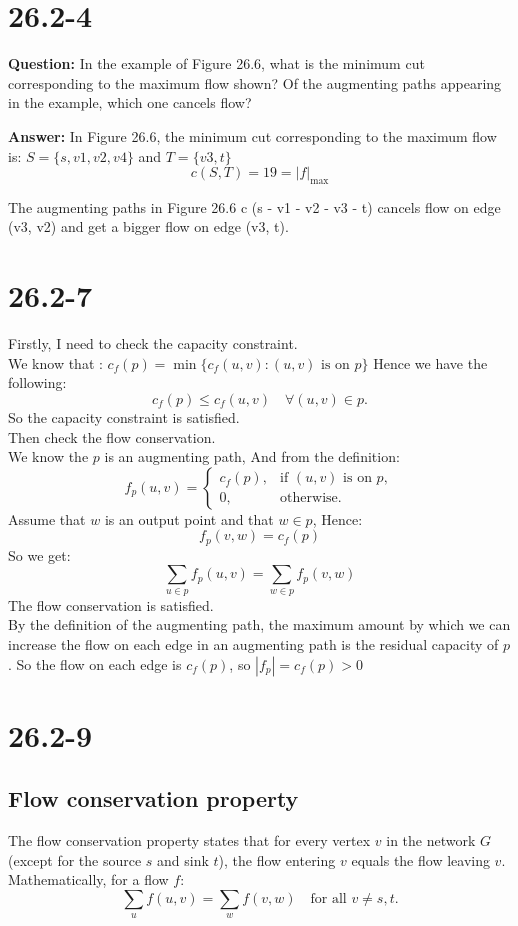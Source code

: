 \documentclass[12pt]{article}
\begin{document}
\section{26.2-4}
\textbf{Question:} In the example of Figure 26.6, what is the minimum cut corresponding to the maximum flow shown? Of the augmenting paths appearing in the example, which one cancels flow?

\textbf{Answer:} 
In Figure 26.6, the minimum cut corresponding to the maximum flow is: $S = \{s, v1, v2, v4\}$ and $T = \{v3, t\}$
\[c(S, T) = 19 = |f|_\max\]


The augmenting paths in Figure 26.6 c (s - v1 - v2 - v3 - t) cancels flow on edge (v3, v2) and get a bigger flow on edge (v3, t).

\section{26.2-7}
Firstly, I need to check the capacity constraint.\\
We know that : \(c_f(p) = \min \{ c_f(u, v) : (u, v) \text{ is on } p \}\)
Hence we have the following:
\[c_f(p) \leq c_f(u, v) \quad \forall (u, v) \in p.\]
So the capacity constraint is satisfied.\\
Then check the flow conservation.\\
We know the \(p\) is an augmenting path, And from the definition:
\[f_p(u, v) =
\begin{cases} 
c_f(p), & \text{if } (u, v) \text{ is on } p, \\ 
0, & \text{otherwise}.
\end{cases}\]
Assume that \(w\) is an output point and that \(w \in p\), Hence:
\[f_p(v, w) = c_f(p)\]
So we get: 
\[\sum_{u \in p} f_p(u, v) =\sum_{w \in p} f_p(v, w)\]
The flow conservation is satisfied.\\
By the definition of the augmenting path, the maximum amount by which we can increase the flow on each edge in an augmenting path is the residual capacity of \(p\).
So the flow on each edge is \(c_f(p)\), so \( |f_p| = c_f(p)> 0\)
\section{26.2-9}
\subsection{Flow conservation property}
The flow conservation property states that for every vertex $v$ in the network $G$ (except for the source $s$ and sink $t$), the flow entering $v$ equals the flow leaving $v$. Mathematically, for a flow $f$:
\[
\sum_{u} f(u, v) = \sum_{w} f(v, w) \quad \text{for all } v \neq s, t.
\]
\end{document}
